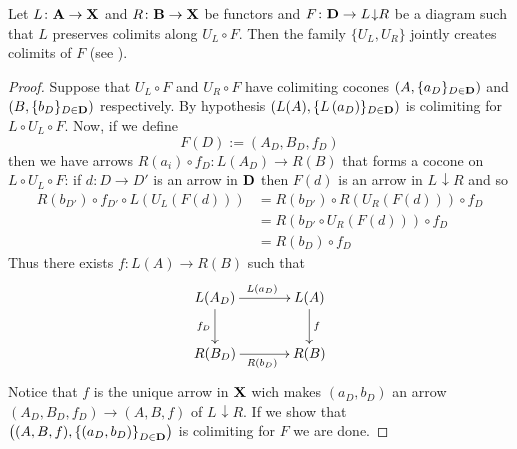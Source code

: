 \documentclass[runningheads,envcountsect]{llncs}
\def\B{\textbf {\textup{B}}}
\def\D{\textbf {\textup{D}}}
\def\X{\textbf {\textup{X}}}
\def\A{\textbf {\textup{A}}}
\newcommand{\comma}[2]{#1\hspace{1pt} {\downarrow}#2}
\begin{document}
\begin{lemma}\label{colim}
	Let $L\colon \A\to \X$ and $R\colon \B\to \X$ be functors and $F\colon \D\to\comma{L}{R}$ be a diagram such that $L$ preserves colimits along $U_L\circ F$. Then the family $\{U_L, U_R\}$ jointly creates colimits of $F$ (see \cite{castelnovo2023thesis,castelnovo2022newcriterionmathcalmmathcalnadhesivity}).
\end{lemma}
\begin{proof}
	Suppose that $U_L\circ F$ and $U_R\circ F$ have colimiting cocones  $\left(A, \{a_D\}_{D\in \D}\right)$ and $\left(B, \{b_D\}_{D\in \D}\right)$ respectively. By hypothesis $\left(L(A), \{L\left(a_D\right)\}_{D\in \D}\right)$ is colimiting for $L\circ U_L\circ F$. Now, if we define
	\[F(D):=(A_D, B_D, f_D)\]
	then we have arrows $R(a_i)\circ f_D\colon L(A_D)\to R(B)$ that forms a cocone on $L\circ U_L\circ F$: if $d\colon D\to D'$ is an arrow in $\D$ then $F(d)$ is an arrow in $\comma{L}{R}$ and so
	\begin{align*}
		R\left(b_{D'}\right)\circ f_{D'}\circ L(U_L(F(d)))&=R\left(b_{D'}\right)\circ R\left(U_R\left(F(d)\right)\right)\circ f_D\\&=R\left(b_{D'}\circ U_R\left(F(d)\right)\right)\circ f_D\\&=R\left(b_D\right)\circ f_D
	\end{align*}
	Thus there exists $f\colon L(A)\rightarrow R(B)$ such that
	\[\xymatrix@C=35pt{ L(A_D) \ar[r]^{L(a_D)} \ar[d]_{f_D}& L(A) \ar[d]^{f}\\ R(B_D) \ar[r]_{R(b_D)} &R(B)}\]
	Notice that $f$ is the unique arrow in $\X$ wich makes $\left(a_D, b_D\right)$ an arrow $\left(A_D, B_D, f_D\right)\to \left(A, B, f\right)$ of $\comma{L}{R}$. If we show that $\left((A, B, f), \left\{(a_D, b_D)\right\}_{D\in \D}\right)$ is colimiting for $F$ we are done.
	

\end{proof}
\end{document}
